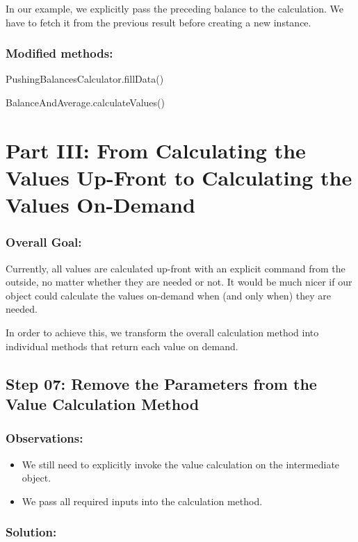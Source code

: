 \documentclass[a4paper,fleqn,titlepage,11pt]{article}
\begin{document}
In our example, we explicitly pass the preceding balance to the calculation. We have to fetch it from the previous result before creating a new instance.

\subsubsection*{Modified methods:}

PushingBalancesCalculator.fillData()

BalanceAndAverage.calculateValues()

\section*{Part III: From Calculating the Values Up-Front to Calculating the Values On-Demand}

\subsubsection*{Overall Goal:}

Currently, all values are calculated up-front with an explicit command from the outside, no matter whether they are needed or not. It would be much nicer if our object could calculate the values on-demand when (and only when) they are needed.

In order to achieve this, we transform the overall calculation method into individual methods that return each value on demand.

\subsection*{Step 07: Remove the Parameters from the Value Calculation Method}

\subsubsection*{Observations:}
\begin{itemize}
\item We still need to explicitly invoke the value calculation on the intermediate object. 
\item We pass all required inputs into the calculation method.
\end{itemize}

\subsubsection*{Solution:}
\end{document}
